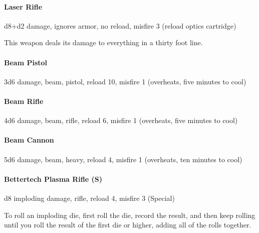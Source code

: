 \documentclass{article}
\begin{document}
\paragraph{Laser Rifle}\label{sec-laser-rifle}%

\noindent{}d8+d2 damage, ignores armor, no reload, misfire 3 (reload optics cartridge)%

This weapon deals its damage to everything in a thirty foot line.%

\paragraph{Beam Pistol}\label{sec-beam-pistol}%

\noindent{}3d6 damage, beam, pistol, reload 10, misfire 1 (overheats, five minutes to cool)%

\paragraph{Beam Rifle}\label{sec-beam-rifle}%

\noindent{}4d6 damage, beam, rifle, reload 6, misfire 1 (overheats, five minutes to cool)%

\paragraph{Beam Cannon}\label{sec-beam-cannon}%

\noindent{}5d6 damage, beam, heavy, reload 4, misfire 1 (overheats, ten minutes to cool)%

\paragraph{Bettertech Plasma Rifle (S)}\label{sec-bettertech-plasma-rifle-s}%

\noindent{}d8 imploding damage, rifle, reload 4, misfire 3 (Special)%

To roll an imploding die, first roll the die, record the result, and then keep rolling until you roll the result of the first die or higher, adding all of the rolls together. %
\end{document}
